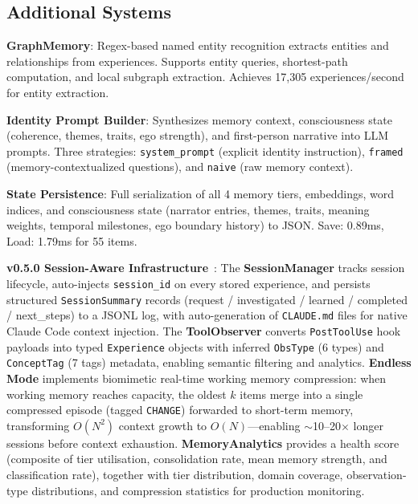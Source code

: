 \documentclass[conference]{IEEEtran}
\begin{document}
\subsection{Additional Systems}

\textbf{GraphMemory}: Regex-based named entity recognition extracts entities and relationships from experiences. Supports entity queries, shortest-path computation, and local subgraph extraction. Achieves 17,305 experiences/second for entity extraction.

\textbf{Identity Prompt Builder}: Synthesizes memory context, consciousness state (coherence, themes, traits, ego strength), and first-person narrative into LLM prompts. Three strategies: \texttt{system\_prompt} (explicit identity instruction), \texttt{framed} (memory-contextualized questions), and \texttt{naive} (raw memory context).

\textbf{State Persistence}: Full serialization of all 4 memory tiers, embeddings, word indices, and consciousness state (narrator entries, themes, traits, meaning weights, temporal milestones, ego boundary history) to JSON. Save: 0.89ms, Load: 1.79ms for 55 items.

\textbf{v0.5.0 Session-Aware Infrastructure}~\cite{claudemem2025}: The \textbf{SessionManager} tracks session lifecycle, auto-injects \texttt{session\_id} on every stored experience, and persists structured \texttt{SessionSummary} records (request / investigated / learned / completed / next\_steps) to a JSONL log, with auto-generation of \texttt{CLAUDE.md} files for native Claude Code context injection. The \textbf{ToolObserver} converts \texttt{PostToolUse} hook payloads into typed \texttt{Experience} objects with inferred \texttt{ObsType} (6 types) and \texttt{ConceptTag} (7 tags) metadata, enabling semantic filtering and analytics. \textbf{Endless Mode} implements biomimetic real-time working memory compression: when working memory reaches capacity, the oldest $k$ items merge into a single compressed episode (tagged \texttt{CHANGE}) forwarded to short-term memory, transforming $O(N^2)$ context growth to $O(N)$---enabling $\sim$10--20$\times$ longer sessions before context exhaustion. \textbf{MemoryAnalytics} provides a health score (composite of tier utilisation, consolidation rate, mean memory strength, and classification rate), together with tier distribution, domain coverage, observation-type distributions, and compression statistics for production monitoring.
\end{document}

